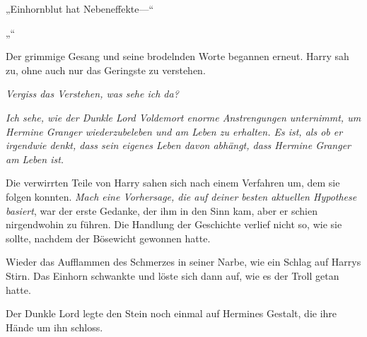 „Einhornblut hat Nebeneffekte—“

„“

Der grimmige Gesang und seine brodelnden Worte begannen erneut.
Harry sah zu, ohne auch nur das Geringste zu verstehen.

\emph{Vergiss das Verstehen, was sehe ich da?}

\emph{Ich sehe, wie der Dunkle Lord Voldemort enorme Anstrengungen unternimmt, um Hermine Granger wiederzubeleben und am Leben zu erhalten. Es ist, als ob er irgendwie denkt, dass sein eigenes Leben davon abhängt, dass Hermine Granger am Leben ist.}

Die verwirrten Teile von Harry sahen sich nach einem Verfahren um, dem sie folgen konnten.
\emph{Mach eine Vorhersage, die auf deiner besten aktuellen Hypothese basiert}, war der erste Gedanke, der ihm in den Sinn kam, aber er schien nirgendwohin zu führen.
Die Handlung der Geschichte verlief nicht so, wie sie sollte, nachdem der Bösewicht gewonnen hatte.

Wieder das Aufflammen des Schmerzes in seiner Narbe, wie ein Schlag auf Harrys Stirn. Das Einhorn schwankte und löste sich dann auf, wie es der Troll getan hatte.

Der Dunkle Lord legte den Stein noch einmal auf Hermines Gestalt, die ihre Hände um ihn schloss.

